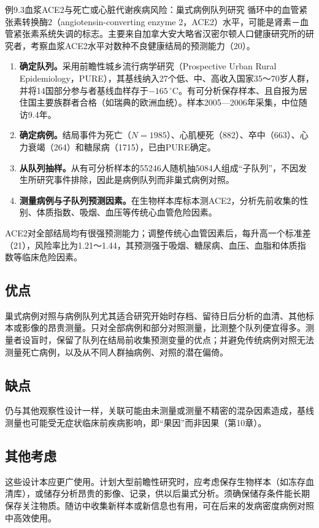 \begin{bookbox}{例9.3\quad 血浆ACE2与死亡或心脏代谢疾病风险：巢式病例队列研究}
循环中的血管紧张素转换酶2（angiotensin-converting enzyme 2，ACE2）水平，可能是肾素－血管紧张素系统失调的标志。主要来自加拿大安大略省汉密尔顿人口健康研究所的研究者，考察血浆ACE2水平对数种不良健康结局的预测能力（20）。
\begin{enumerate}
\item \textbf{确定队列。}采用前瞻性城乡流行病学研究（Prospective Urban Rural Epidemiology，PURE），其基线纳入27个低、中、高收入国家35～70岁人群，并将14国部分参与者基线血样存于$-165\,^{\circ}\mathrm{C}$。有可分析保存样本、且自报为居住国主要族群者合格（如瑞典的欧洲血统）。样本2005—2006年采集，中位随访9.4年。
\item \textbf{确定病例。}结局事件为死亡（$N=1985$）、心肌梗死（882）、卒中（663）、心力衰竭（264）和糖尿病（1715），已由PURE确定。
\item \textbf{从队列抽样。}从有可分析样本的55246人随机抽5084人组成“子队列”，不因发生所研究事件排除，因此是病例队列而非巢式病例对照。
\item \textbf{测量病例与子队列预测因素。}在生物样本库标本测ACE2，分析先前收集的性别、体质指数、吸烟、血压等传统心血管危险因素。
\end{enumerate}
ACE2对全部结局均有很强预测能力；调整传统心血管因素后，每升高一个标准差（21），风险率比为1.21～1.44，其预测强于吸烟、糖尿病、血压、血脂和体质指数等临床危险因素。
\end{bookbox}

\subsection{优点}
巢式病例对照与病例队列尤其适合研究开始时存档、留待日后分析的血清、其他标本或影像的昂贵测量。只对全部病例和部分对照测量，比测整个队列便宜得多。测量者设盲时，保留了队列在结局前收集预测变量的优点；并避免传统病例对照无法测量死亡病例，以及从不同人群抽病例、对照的潜在偏倚。

\subsection{缺点}
仍与其他观察性设计一样，关联可能由未测量或测量不精密的混杂因素造成，基线测量也可能受无症状临床前疾病影响，即“果因”而非因果（第10章）。

\subsection{其他考虑}
这些设计本应更广使用。计划大型前瞻性研究时，应考虑保存生物样本（如冻存血清库），或储存分析昂贵的影像、记录，供以后巢式分析。须确保储存条件能长期保存关注物质。随访中收集新样本或新信息也有用，可在后来的发病密度病例对照中高效使用。

